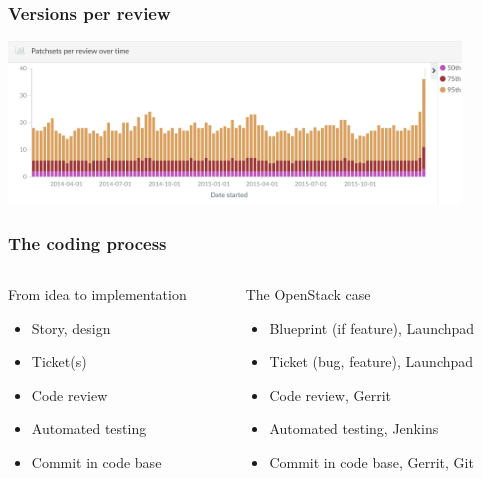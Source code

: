 \documentclass[17pt,aspectratio=169,hyperref=pdfusetitle]{beamer}
\begin{document}

\begin{frame}
\frametitle{Versions per review}

\begin{center}
  \includegraphics[width=12cm]{figs/patchsets-per-review}
\end{center}

\end{frame}


\begin{frame}
\frametitle{The coding process}

\begin{columns}[T]
\begin{column}{.40\textwidth}
{\footnotesize
  From idea to implementation
  
\begin{itemize}
\item Story, design
\item Ticket(s)
\item Code review
\item Automated testing
\item Commit in code base
\end{itemize}
}
\end{column}%
\hfill%
\begin{column}{.58\textwidth}
{\footnotesize
  The OpenStack case

\begin{itemize}
\item Blueprint (if feature), Launchpad
\item Ticket (bug, feature), Launchpad
\item Code review, Gerrit
\item Automated testing, Jenkins
\item Commit in code base, Gerrit, Git
\end{itemize}
}
\end{column}%
\end{columns}

\end{frame}
\end{document}
